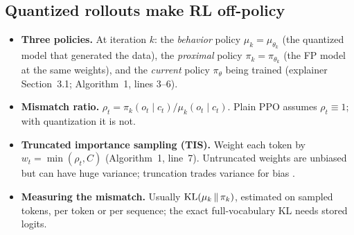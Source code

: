 \documentclass[11pt]{article}
\begin{document}
\subsection{Quantized rollouts make RL off-policy}
\begin{itemize}
\item \textbf{Three policies.} At iteration $k$: the \emph{behavior} policy $\mu_k=\mu_{\theta_k}$ (the quantized model that generated the data), the \emph{proximal} policy $\pi_k=\pi_{\theta_k}$ (the FP model at the same weights), and the \emph{current} policy $\pi_\theta$ being trained \citep{hilton2022batch,fu2025areal} (explainer Section~3.1; Algorithm~1, lines 3--6).
\item \textbf{Mismatch ratio.} $\rho_t=\pi_k(o_t\mid c_t)/\mu_k(o_t\mid c_t)$. Plain PPO assumes $\rho_t\equiv1$; with quantization it is not.
\item \textbf{Truncated importance sampling (TIS).} Weight each token by $w_t=\min(\rho_t,C)$ \citep{yao2025flashrl} (Algorithm~1, line~7). Untruncated weights are unbiased but can have huge variance; truncation trades variance for bias \citep{ionides2008truncated}.
\item \textbf{Measuring the mismatch.} Usually $\mathrm{KL}(\mu_k\,\|\,\pi_k)$, estimated on sampled tokens, per token or per sequence; the exact full-vocabulary KL needs stored logits.
\end{itemize}
\end{document}

